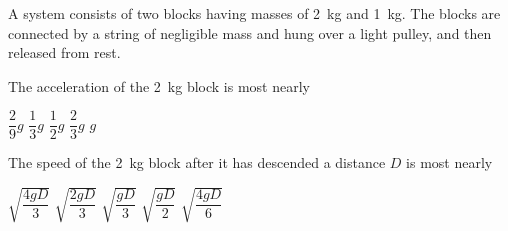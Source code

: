 \documentclass{../../../oss-ap12ibhl}
\begin{document}
\begin{questions}
{    A system consists of two blocks having masses of \SI{2}{\kilo\gram} and
    \SI{1}{\kilo\gram}. The blocks are connected by a string of negligible mass
    and hung over a light pulley, and then released from rest.
    \begin{center}
    \end{center}
  }

  \question The acceleration of the \SI{2}{\kilo\gram} block is most nearly
  \begin{choices}
    \choice $\dfrac29g$
    \choice $\dfrac13g$
    \choice $\dfrac12g$
    \choice $\dfrac23g$
    \choice $g$
  \end{choices}
  \label{q:pulley1}
    
  \question The speed of the \SI{2}{\kilo\gram} block after it has descended a
  distance $D$ is most nearly
  \begin{choices}
    \choice $\sqrt{\dfrac{4gD}{3}}$
    \choice $\sqrt{\dfrac{2gD}{3}}$
    \choice $\sqrt{\dfrac{gD}{3}}$
    \choice $\sqrt{\dfrac{gD}{2}}$
    \choice $\sqrt{\dfrac{4gD}{6}}$
  \end{choices}
  \label{q:pulley2}

%
%  
%    
  

\end{questions}
\end{document}
